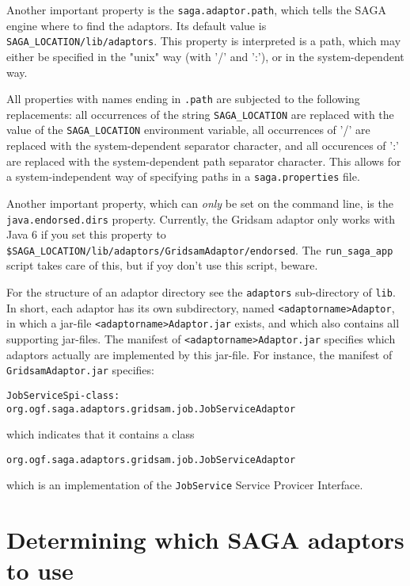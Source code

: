 \documentclass[a4paper,10pt]{article}
\begin{document}
Another important property is the \texttt{saga.adaptor.path},
which tells the SAGA engine where to find the adaptors.
Its default value is \texttt{SAGA\_LOCATION/lib/adaptors}.
This property is interpreted is a path, which may either be specified in the
"unix" way (with '/' and ':'), or in the system-dependent way.

All properties with names ending in \texttt{.path} are subjected to
the following replacements: all occurrences of the string
\texttt{SAGA\_LOCATION} are replaced with the value of the
\texttt{SAGA\_LOCATION} environment variable, all occurrences
of '/' are replaced with the system-dependent separator character,
and all occurences of ':' are replaced with the system-dependent
path separator character. This allows for a system-independent way
of specifying paths in a \texttt{saga.properties} file.

Another important property, which can \emph{only} be set on the
command line, is the \texttt{java.endorsed.dirs} property. Currently,
the Gridsam adaptor only works with Java 6 if you set this property
to \texttt{\$SAGA\_LOCATION/lib/adaptors/GridsamAdaptor/endorsed}.
The \texttt{run\_saga\_app} script takes care of this, but if yoy don't
use this script, beware.

For the structure of an adaptor directory see the \texttt{adaptors}
sub-directory of \texttt{lib}.
In short, each adaptor has its own subdirectory, named
\texttt{<adaptorname>Adaptor},
in which a jar-file
\texttt{<adaptorname>Adaptor.jar}
exists, and which also contains
all supporting jar-files.
The manifest of
\texttt{<adaptorname>Adaptor.jar} specifies which adaptors actually
are implemented by this jar-file. For instance, 
the manifest of \texttt{GridsamAdaptor.jar} specifies:

\noindent
{\small
\begin{verbatim}
JobServiceSpi-class: org.ogf.saga.adaptors.gridsam.job.JobServiceAdaptor
\end{verbatim}
}
\noindent

which indicates that it contains a class
\noindent
{\small
\begin{verbatim}
org.ogf.saga.adaptors.gridsam.job.JobServiceAdaptor
\end{verbatim}
}
\noindent
which is an implementation of the \texttt{JobService}
Service Provicer Interface.

\section{Determining which SAGA adaptors to use}
\end{document}
